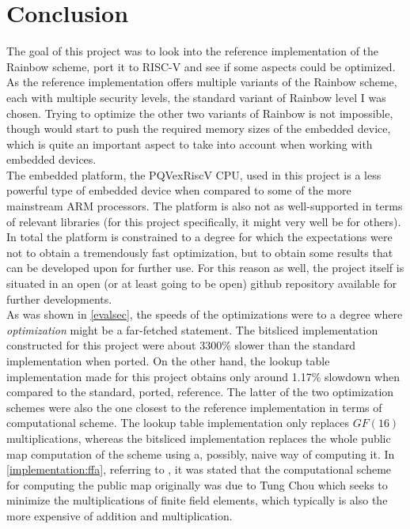 \section{Conclusion}
The goal of this project was to look into the reference implementation of the Rainbow scheme, port it to RISC-V and see if some aspects could be optimized. As the reference implementation offers multiple variants of the Rainbow scheme, each with multiple security levels, the standard variant of Rainbow level I was chosen. Trying to optimize the other two variants of Rainbow is not impossible, though would start to push the required memory sizes of the embedded device, which is quite an important aspect to take into account when working with embedded devices.
\medskip\\
The embedded platform, the PQVexRiscV CPU, used in this project is a less powerful type of embedded device when compared to some of the more mainstream ARM processors. The platform is also not as well-supported in terms of relevant libraries (for this project specifically, it might very well be for others). In total the platform is constrained to a degree for which the expectations were not to obtain a tremendously fast optimization, but to obtain some results that can be developed upon for further use. For this reason as well, the project itself is situated in an open (or at least going to be open) github repository available for further developments.
\medskip\\
As was shown in \cref{evalsec}, the speeds of the optimizations were to a degree where \emph{optimization} might be a far-fetched statement. The bitsliced implementation constructed for this project were about 3300\% slower than the standard implementation when ported. On the other hand, the lookup table implementation made for this project obtains only around 1.17\% slowdown when compared to the standard, ported, reference. The latter of the two optimization schemes were also the one closest to the reference implementation in terms of computational scheme. The lookup table implementation only replaces $GF(16)$ multiplications, whereas the bitsliced implementation replaces the whole public map computation of the scheme using a, possibly, naive way of computing it. In \cref{implementation:ffa}, referring to \cite{rainbownist}, it was stated that the computational scheme for computing the public map originally was due to Tung Chou which seeks to minimize the multiplications of finite field elements, which typically is also the more expensive of addition and multiplication.
\medskip\\
